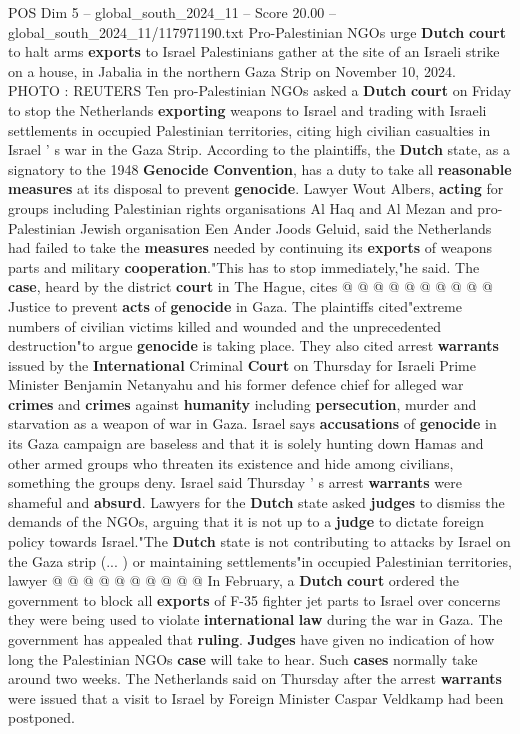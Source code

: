 \begin{textsample}{POS Dim 5 – global\_south\_2024\_11 – Score 20.00 – global\_south\_2024\_11/117971190.txt}  \label{ex:f5_pos_022}
Pro-Palestinian NGOs urge \textbf{Dutch} \textbf{court} to halt arms \textbf{exports} to Israel Palestinians gather at the site of an Israeli strike on a house, in Jabalia in the northern Gaza Strip on November 10, 2024.
PHOTO : REUTERS Ten pro-Palestinian NGOs asked a \textbf{Dutch} \textbf{court} on Friday to stop the Netherlands \textbf{exporting} weapons to Israel and trading with Israeli settlements in occupied Palestinian territories, citing high civilian casualties in Israel ' s war in the Gaza Strip.
According to the plaintiffs, the \textbf{Dutch} state, as a signatory to the 1948 \textbf{Genocide} \textbf{Convention}, has a duty to take all \textbf{reasonable} \textbf{measures} at its disposal to prevent \textbf{genocide}.
Lawyer Wout Albers, \textbf{acting} for groups including Palestinian rights organisations Al Haq and Al Mezan and pro-Palestinian Jewish organisation Een Ander Joods Geluid, said the Netherlands had failed to take the \textbf{measures} needed by continuing its \textbf{exports} of weapons parts and military \textbf{cooperation}."This has to stop immediately,"he said.
The \textbf{case}, heard by the district \textbf{court} in The Hague, cites @ @ @ @ @ @ @ @ @ @ Justice to prevent \textbf{acts} of \textbf{genocide} in Gaza.
The plaintiffs cited"extreme numbers of civilian victims killed and wounded and the unprecedented destruction"to argue \textbf{genocide} is taking place.
They also cited arrest \textbf{warrants} issued by the \textbf{International} Criminal \textbf{Court} on Thursday for Israeli Prime Minister Benjamin Netanyahu and his former defence chief for alleged war \textbf{crimes} and \textbf{crimes} against \textbf{humanity} including \textbf{persecution}, murder and starvation as a weapon of war in Gaza.
Israel says \textbf{accusations} of \textbf{genocide} in its Gaza campaign are baseless and that it is solely hunting down Hamas and other armed groups who threaten its existence and hide among civilians, something the groups deny.
Israel said Thursday ' s arrest \textbf{warrants} were shameful and \textbf{absurd}.
Lawyers for the \textbf{Dutch} state asked \textbf{judges} to dismiss the demands of the NGOs, arguing that it is not up to a \textbf{judge} to dictate foreign policy towards Israel."The \textbf{Dutch} state is not contributing to attacks by Israel on the Gaza strip (... ) or maintaining settlements"in occupied Palestinian territories, lawyer @ @ @ @ @ @ @ @ @ @ In February, a \textbf{Dutch} \textbf{court} ordered the government to block all \textbf{exports} of F-35 fighter jet parts to Israel over concerns they were being used to violate \textbf{international} \textbf{law} during the war in Gaza.
The government has appealed that \textbf{ruling}. \textbf{Judges} have given no indication of how long the Palestinian NGOs \textbf{case} will take to hear.
Such \textbf{cases} normally take around two weeks.
The Netherlands said on Thursday after the arrest \textbf{warrants} were issued that a visit to Israel by Foreign Minister Caspar Veldkamp had been postponed.


\end{textsample}
